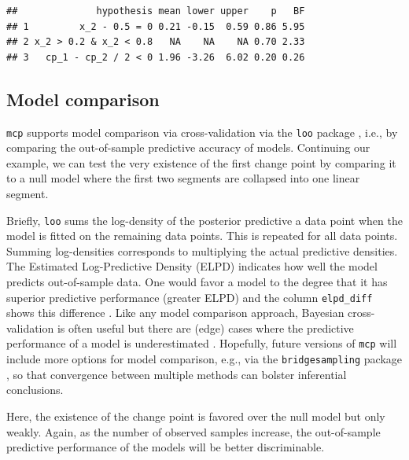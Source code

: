 \documentclass[
  american,
]{article}
\begin{document}
\begin{verbatim}
##              hypothesis mean lower upper    p   BF
## 1         x_2 - 0.5 = 0 0.21 -0.15  0.59 0.86 5.95
## 2 x_2 > 0.2 & x_2 < 0.8   NA    NA    NA 0.70 2.33
## 3   cp_1 - cp_2 / 2 < 0 1.96 -3.26  6.02 0.20 0.26
\end{verbatim}

\hypertarget{model-comparison}{%
\subsection{Model comparison}\label{model-comparison}}

\texttt{mcp} supports model comparison via cross-validation via the \texttt{loo} package \citep{vehtari2017}, i.e., by comparing the out-of-sample predictive accuracy of models. Continuing our example, we can test the very existence of the first change point by comparing it to a null model where the first two segments are collapsed into one linear segment.

Briefly, \texttt{loo} sums the log-density of the posterior predictive a data point when the model is fitted on the remaining data points. This is repeated for all data points. Summing log-densities corresponds to multiplying the actual predictive densities. The Estimated Log-Predictive Density (ELPD) indicates how well the model predicts out-of-sample data. One would favor a model to the degree that it has superior predictive performance (greater ELPD) and the column \texttt{elpd\_diff} shows this difference \citep{vehtari2017, gelman2013b}. Like any model comparison approach, Bayesian cross-validation is often useful but there are (edge) cases where the predictive performance of a model is underestimated \citep{gronau2019a}. Hopefully, future versions of \texttt{mcp} will include more options for model comparison, e.g., via the \texttt{bridgesampling} package \citep{gronau2018}, so that convergence between multiple methods can bolster inferential conclusions.

Here, the existence of the change point is favored over the null model but only weakly. Again, as the number of observed samples increase, the out-of-sample predictive performance of the models will be better discriminable.
\end{document}
